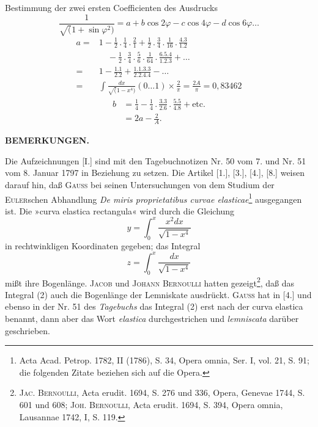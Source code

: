 \begingroup
\setlength{\headheight}{25pt}
\noindent{\small [S. 54]}
\par\noindent\hspace*{\parindent}Bestimmung der zwei ersten Coefficienten des Ausdrucks
\[\frac1{\surd(1+\sin\varphi^2)}=a+b\cos2\varphi-c\cos4\varphi-d\cos6\varphi\ldots\]
\[\begin{aligned}
a={}&1-\frac12\mathpunct{.}\frac14\mathpunct{.}\frac21
+\frac12\mathpunct{.}\frac34\mathpunct{.}\frac1{16}\mathpunct{.}\frac{4.3}{1.2}\\
&\quad-\frac12\mathpunct{.}\frac34\mathpunct{.}\frac56\mathpunct{.}\frac1{64}\mathpunct{.}\frac{6.5.4}{1.2.3}+\ldots\\
={}&1-\frac{1.1}{2.2}+\frac{1.1.3.3}{2.2.4.4}-\ldots\\
={}&\int\frac{dx}{\surd(1-x^4)}(0\ldots1)\times\frac2\pi=\frac{2A}\pi=0{,}83462
\end{aligned}\]
\[\begin{aligned}
b&=\frac14-\frac14\mathpunct{.}\frac{3.3}{2.6}\mathpunct{.}\frac{5.5}{4.8}+\text{etc.}\\
&=2a-\frac2A.
\end{aligned}\]
\begin{center}\bfseries BEMERKUNGEN.\end{center}
\small
\makeatletter\tagsleft@true\let\veqno\@@leqno\makeatother
\renewcommand{\thefootnote}{*)}
\noindent\hspace*{\parindent}Die Aufzeichnungen [I.] sind mit den Tagebuchnotizen Nr. 50 vom 7. und Nr. 51 vom 8. Januar 1797
in Beziehung zu setzen. Die Artikel [1.], [3.], [4.], [8.] weisen darauf hin, daß \textsc{Gauss} bei seinen Untersuchungen
von dem Studium der \textsc{Euler}schen Abhandlung \textit{De miris proprietatibus curvae elasticae}\footnote{Acta Acad. Petrop. 1782, II (1786), S. 34, Opera omnia, Ser. I, vol. 21, S. 91; die folgenden Zitate beziehen sich auf die Opera.}
ausgegangen ist. Die »curva elastica rectangula« wird durch die Gleichung
\begin{equation}y=\int_0^x\frac{x^2dx}{\sqrt{1-x^4}}\tag{1}\end{equation}
\noindent in rechtwinkligen Koordinaten gegeben; das Integral
\begin{equation}z=\int_0^x\frac{dx}{\sqrt{1-x^4}}\tag{2}\end{equation}
\noindent mißt ihre Bogenlänge. \textsc{Jacob} und \textsc{Johann Bernoulli} hatten gezeigt\renewcommand{\thefootnote}{**)}\footnote{\textsc{Jac. Bernoulli}, Acta erudit. 1694, S. 276 und 336, Opera, Genevae 1744, S. 601 und 608; \textsc{Joh. Bernoulli}, Acta erudit. 1694, S. 394, Opera omnia, Lausannae 1742, I, S. 119.},
daß das Integral (2) auch die Bogenlänge der Lemniskate ausdrückt. \textsc{Gauss} hat in [4.] und ebenso in der Nr. 51 des \textit{Tagebuchs}
das Integral (2) erst nach der curva elastica benannt, dann aber das Wort \textit{elastica} durchgestrichen und \textit{lemniscata} darüber geschrieben.

